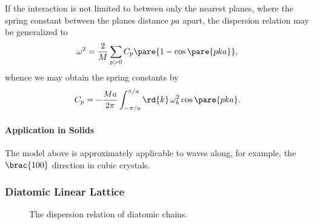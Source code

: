 \documentclass[hidelinks]{article}
\begin{document}
If the interaction is not limited to between only the nearest planes, where the spring constant between the planes distance $pa$ apart, the dispersion relation may be generalized to
\[ \omega^2 = \frac{2}{M}\sum_{p>0} C_p \pare{1-\cos \pare{pka}}, \]
whence we may obtain the spring constants by
\[ C_p = -\frac{Ma}{2\pi} \int_{-\pi/a}^{\pi/a} \rd{k}\, \omega_k^2 \cos \pare{pka}. \]


\paragraph{Application in Solids} %
\label{par:application_in_solids}

The model above is approximately applicable to waves along, for example, the $\brac{100}$ direction in cubic crystals.



\subsubsection{Diatomic Linear Lattice} %
\label{ssub:diatomic_linear_lattice}

\begin{figure}[ht]
    \centering
    \caption{The dispersion relation of diatomic chains.}
    \label{fig:dispersion_diatomic_1d}
\end{figure}
\end{document}
